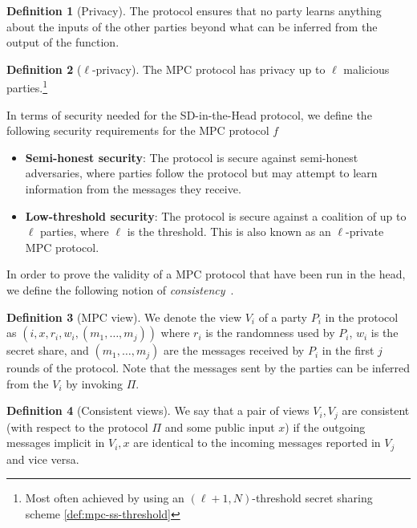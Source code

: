 \documentclass[11pt]{report}
\theoremstyle{definition}
\newtheorem{definition}{Definition}[section]
\theoremstyle{plain}
\begin{document}
\begin{definition}[Privacy]\label{def:mpc-privacy}
  The protocol ensures that no party learns anything about the inputs of the other parties beyond what can be inferred from the output of the function.
\end{definition}

\begin{definition}[$\ell$-privacy]\label{def:mpc-ell-privacy}
  The MPC protocol has privacy up to $\ell$ malicious parties.\footnote{Most often achieved by using an $(\ell + 1, N)$-threshold secret sharing scheme \autoref{def:mpc-ss-threshold}}
\end{definition}

In terms of security needed for the SD-in-the-Head protocol, we define the following security requirements for the MPC protocol $f$

\begin{itemize}
  \item \textbf{Semi-honest security}: The protocol is secure against semi-honest adversaries, where parties follow the protocol but may attempt to learn information from the messages they receive.
  \item \textbf{Low-threshold security}: The protocol is secure against a coalition of up to $\ell$ parties, where $\ell$ is the threshold. This is also known as an $\ell$-private MPC protocol.
\end{itemize}

In order to prove the validity of a MPC protocol that have been run in the head, we define the following notion of \textit{consistency}~\cite{ishai2007zero}.

\begin{definition}[MPC view]\label{def:mpc-view}
  We denote the view $V_i$ of a party $P_i$ in the protocol as $(i, x, r_i, w_i, (m_1, \dots, m_j))$ where $r_i$ is the randomness used by $P_i$, $w_i$ is the secret share, and $(m_1, \dots, m_j)$ are the messages received by $P_i$ in the first $j$ rounds of the protocol. Note that the messages sent by the parties can be inferred from the $V_i$ by invoking $\Pi$.
\end{definition}

\begin{definition}[Consistent views]\label{def:mpc-consistent-view}
  We say that a pair of views $V_i, V_j$ are consistent (with respect to the protocol $\Pi$ and some public input $x$) if the outgoing messages implicit in $V_i, x$ are identical to the incoming messages reported in $V_j$ and vice versa.
\end{definition}
\end{document}
